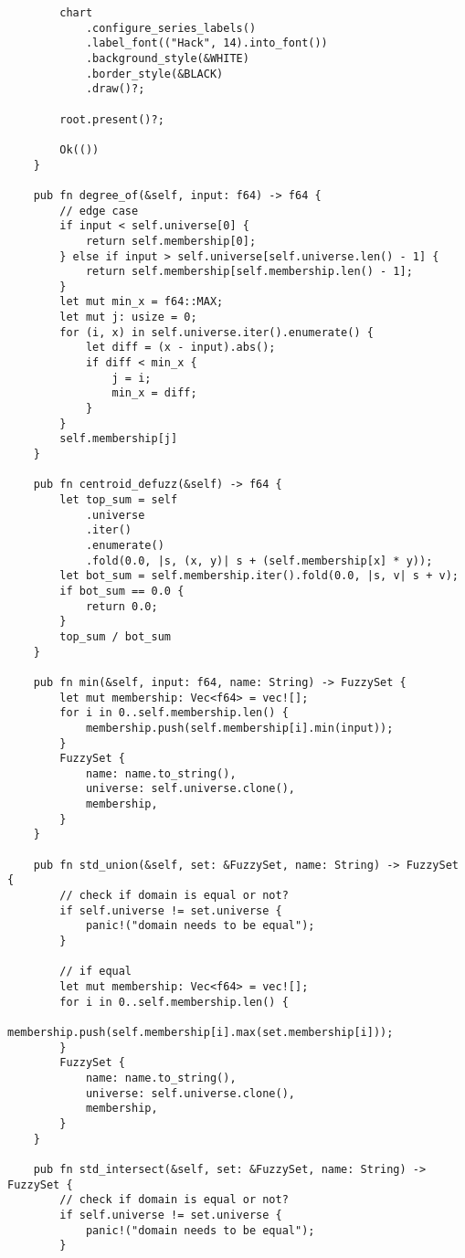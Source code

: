 \begin{verbatim}
        chart
            .configure_series_labels()
            .label_font(("Hack", 14).into_font())
            .background_style(&WHITE)
            .border_style(&BLACK)
            .draw()?;

        root.present()?;

        Ok(())
    }

    pub fn degree_of(&self, input: f64) -> f64 {
        // edge case
        if input < self.universe[0] {
            return self.membership[0];
        } else if input > self.universe[self.universe.len() - 1] {
            return self.membership[self.membership.len() - 1];
        }
        let mut min_x = f64::MAX;
        let mut j: usize = 0;
        for (i, x) in self.universe.iter().enumerate() {
            let diff = (x - input).abs();
            if diff < min_x {
                j = i;
                min_x = diff;
            }
        }
        self.membership[j]
    }

    pub fn centroid_defuzz(&self) -> f64 {
        let top_sum = self
            .universe
            .iter()
            .enumerate()
            .fold(0.0, |s, (x, y)| s + (self.membership[x] * y));
        let bot_sum = self.membership.iter().fold(0.0, |s, v| s + v);
        if bot_sum == 0.0 {
            return 0.0;
        }
        top_sum / bot_sum
    }

    pub fn min(&self, input: f64, name: String) -> FuzzySet {
        let mut membership: Vec<f64> = vec![];
        for i in 0..self.membership.len() {
            membership.push(self.membership[i].min(input));
        }
        FuzzySet {
            name: name.to_string(),
            universe: self.universe.clone(),
            membership,
        }
    }

    pub fn std_union(&self, set: &FuzzySet, name: String) -> FuzzySet {
        // check if domain is equal or not?
        if self.universe != set.universe {
            panic!("domain needs to be equal");
        }

        // if equal
        let mut membership: Vec<f64> = vec![];
        for i in 0..self.membership.len() {
            membership.push(self.membership[i].max(set.membership[i]));
        }
        FuzzySet {
            name: name.to_string(),
            universe: self.universe.clone(),
            membership,
        }
    }

    pub fn std_intersect(&self, set: &FuzzySet, name: String) -> FuzzySet {
        // check if domain is equal or not?
        if self.universe != set.universe {
            panic!("domain needs to be equal");
        }


\end{verbatim}
